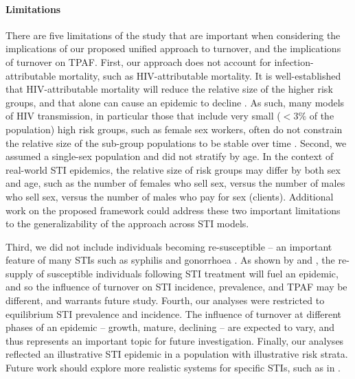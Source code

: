 \paragraph{Limitations}
There are five limitations of the study that are important when considering
the implications of our proposed unified approach to turnover,
and the implications of turnover on TPAF.
First, our approach does not account for
infection-attributable mortality, such as HIV-attributable mortality.
It is well-established that HIV-attributable mortality will reduce the 
relative size of the higher risk groups,
and that alone can cause an epidemic to decline \citep{Boily1997}.
As such, many models of HIV transmission,
in particular those that include very small ($<3\%$ of the population)
high risk groups, such as female sex workers,
often do not constrain the relative size
of the sub-group populations to be stable over time
\citep{Pickles2013}.
Second, we assumed a single-sex population and did not stratify by age.
In the context of real-world STI epidemics,
the relative size of risk groups may differ
by both sex and age,
such as the number of females who sell sex,
versus the number of males who sell sex,
versus the number of males who pay for sex (clients).
Additional work on the proposed framework could address
these two important limitations to the generalizability of the approach across STI models.
\par
Third, we did not include individuals becoming re-susceptible
-- an important feature of many STIs such as syphilis and gonorrhoea
\citep{Fenton2008}.
As shown by \citet{Fenton2008} and \citet{Pourbohloul2003},
the re-supply of susceptible individuals following STI treatment
will fuel an epidemic, and so the influence of turnover on
STI incidence, prevalence, and TPAF may be different, and warrants future study.
Fourth, our analyses were restricted to
equilibrium STI prevalence and incidence.
The influence of turnover at different phases of an epidemic
-- growth, mature, declining --
are expected to vary, and thus represents an important topic for future investigation.
Finally, our analyses reflected an illustrative STI epidemic
in a population with illustrative risk strata.
Future work should explore more realistic systems for specific STIs,
such as in \citep{Johnson2016}.
